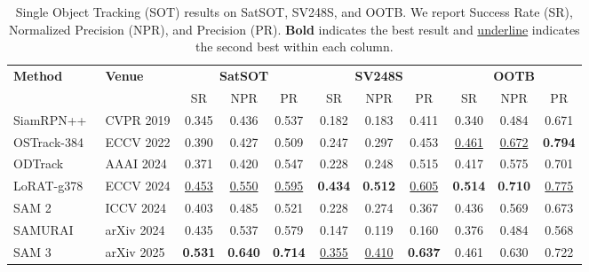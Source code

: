\begin{table}[t]
\centering
\caption{Single Object Tracking (SOT) results on SatSOT, SV248S, and OOTB.
We report Success Rate (SR), Normalized Precision (NPR), and Precision (PR).
\textbf{Bold} indicates the best result and \underline{underline} indicates the second best within each column.}
\label{tab:sot_results}
\setlength{\tabcolsep}{4pt}
\renewcommand{\arraystretch}{1.15}
\begin{tabular}{l l ccc ccc ccc}
\toprule
\multirow{2}{*}{\textbf{Method}} & \multirow{2}{*}{\textbf{Venue}} 
 & \multicolumn{3}{c}{\textbf{SatSOT}}
 & \multicolumn{3}{c}{\textbf{SV248S}}
 & \multicolumn{3}{c}{\textbf{OOTB}} \\
\cmidrule(lr){3-5} \cmidrule(lr){6-8} \cmidrule(lr){9-11}
& & SR & NPR & PR & SR & NPR & PR & SR & NPR & PR \\
\midrule
SiamRPN++~\cite{li2019siamrpn++}    & CVPR 2019  & 0.345             & 0.436             & 0.537             & 0.182             & 0.183             & 0.411             & 0.340             & 0.484             & 0.671             \\
OSTrack-384~\cite{ye2022joint}  & ECCV 2022  & 0.390             & 0.427             & 0.509             & 0.247             & 0.297             & 0.453             & \underline{0.461} & \underline{0.672} & \textbf{0.794}    \\
ODTrack~\cite{zheng2024odtrack}      & AAAI 2024  & 0.371             & 0.420             & 0.547             & 0.228             & 0.248             & 0.515             & 0.417             & 0.575             & 0.701             \\
LoRAT-g378~\cite{lin2024tracking}   & ECCV 2024  & \underline{0.453} & \underline{0.550} & \underline{0.595} & \textbf{0.434}    & \textbf{0.512}    & \underline{0.605} & \textbf{0.514}    & \textbf{0.710}    & \underline{0.775} \\
SAM 2~\cite{ravi2024sam}        & ICCV 2024  & 0.403             & 0.485             & 0.521             & 0.228             & 0.274             & 0.367             & 0.436             & 0.569             & 0.673             \\
SAMURAI~\cite{yang2026samurai}      & arXiv 2024 & 0.435             & 0.537             & 0.579             & 0.147             & 0.119             & 0.160             & 0.376             & 0.484             & 0.568             \\
SAM 3~\cite{carion2026sam3}        & arXiv 2025 & \textbf{0.531}    & \textbf{0.640}    & \textbf{0.714}    & \underline{0.355} & \underline{0.410} & \textbf{0.637}    & 0.461             & 0.630             & 0.722             \\
\bottomrule
\end{tabular}
\end{table}
